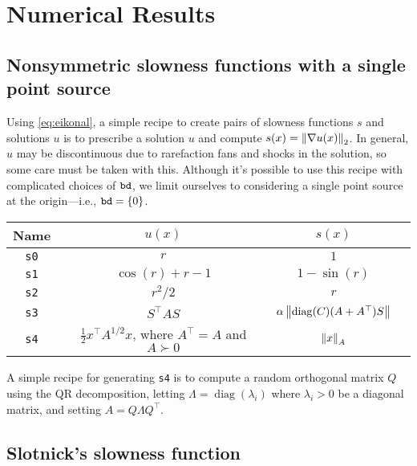 \documentclass[sisc-eikonal.tex]{subfiles}
\begin{document}
\section{Numerical Results}\label{sec:numerical-results}

\subsection[Single point source]{Nonsymmetric slowness functions with
  a single point source}\label{ssec:point-source-problems}

Using \cref{eq:eikonal}, a simple recipe to create pairs of slowness
functions $s$ and solutions $u$ is to prescribe a solution $u$ and
compute $s(x) = \left\|\nabla u(x)\right\|_2$. In general, $u$ may be
discontinuous due to rarefaction fans and shocks in the solution, so
some care must be taken with this. Although it's possible to use this
recipe with complicated choices of $\texttt{bd}$, we limit ourselves to
considering a single point source at the origin---i.e.,
$\texttt{bd} = \left\{0\right\}$.

\begin{center}
  \begin{tabular}{cccc}
    Name & $u(x)$ & $s(x)$ \\
    \midrule
    \texttt{s0} & $r$ & $1$ \\
    \texttt{s1} & $\cos(r) + r - 1$ & $1 - \sin(r)$ \\
    \texttt{s2} & $r^2/2$ & $r$ \\
    \texttt{s3} & $S^\top A S$ & $\alpha\left\|\operatorname{diag}(C){(A + A^\top)}S\right\|$ \\
    \texttt{s4} & $\tfrac{1}{2} x^\top A^{1/2} x$, where $A^\top = A$ and $A \succ 0$ & $\left\|x\right\|_A$
  \end{tabular}
\end{center}

A simple recipe for generating \texttt{s4} is to compute a random
orthogonal matrix $Q$ using the QR decomposition, letting
$\Lambda = \operatorname{diag}(\lambda_i)$ where $\lambda_i > 0$ be a
diagonal matrix, and setting $A = Q\Lambda Q^\top$.

\subsection{Slotnick's slowness function}\label{ssec:slotnick}
\end{document}
